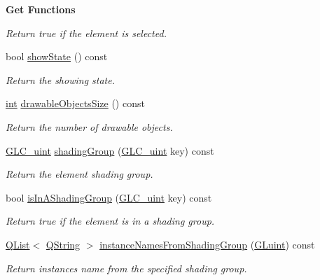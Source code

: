\begin{Indent}{\bf Get Functions}
\begin{DoxyCompactItemize}
\begin{DoxyCompactList}\small\item\em Return true if the element is selected. \end{DoxyCompactList}\item 
bool \hyperlink{class_g_l_c__3_d_view_collection_a3df36a48ff84e2f508737638381482fb}{show\-State} () const 
\begin{DoxyCompactList}\small\item\em Return the showing state. \end{DoxyCompactList}\item 
\hyperlink{ioapi_8h_a787fa3cf048117ba7123753c1e74fcd6}{int} \hyperlink{class_g_l_c__3_d_view_collection_a703f47dc07ff1c0915e2ec758bc2eb1a}{drawable\-Objects\-Size} () const 
\begin{DoxyCompactList}\small\item\em Return the number of drawable objects. \end{DoxyCompactList}\item 
\hyperlink{glc__global_8h_abf950976fabed69026558df8e2da6c6b}{G\-L\-C\-\_\-uint} \hyperlink{class_g_l_c__3_d_view_collection_a9df8959d16ea35b1b4f6a5c20da462bb}{shading\-Group} (\hyperlink{glc__global_8h_abf950976fabed69026558df8e2da6c6b}{G\-L\-C\-\_\-uint} key) const 
\begin{DoxyCompactList}\small\item\em Return the element shading group. \end{DoxyCompactList}\item 
bool \hyperlink{class_g_l_c__3_d_view_collection_a674fa9e130e620be50e5c1321f462b1b}{is\-In\-A\-Shading\-Group} (\hyperlink{glc__global_8h_abf950976fabed69026558df8e2da6c6b}{G\-L\-C\-\_\-uint} key) const 
\begin{DoxyCompactList}\small\item\em Return true if the element is in a shading group. \end{DoxyCompactList}\item 
\hyperlink{class_q_list}{Q\-List}$<$ \hyperlink{group___u_a_v_objects_plugin_gab9d252f49c333c94a72f97ce3105a32d}{Q\-String} $>$ \hyperlink{class_g_l_c__3_d_view_collection_a7991699f36c4cca8dca90c9a838889c1}{instance\-Names\-From\-Shading\-Group} (\hyperlink{glext_8h_a2f0c8cd5c21f9fcbd931c3f48bc90dfc}{G\-Luint}) const 
\begin{DoxyCompactList}\small\item\em Return instances name from the specified shading group. \end{DoxyCompactList}\item 

\end{DoxyCompactItemize}
\end{Indent}
